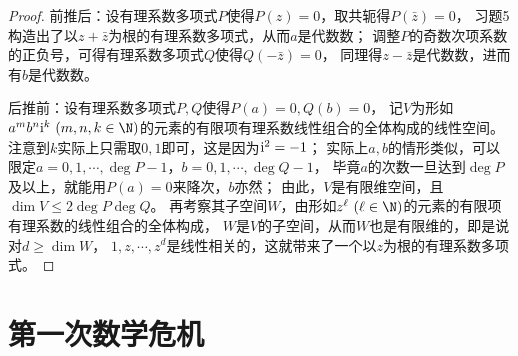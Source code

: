 \begin{1b}
\begin{enumerate}
\begin{proof}
前推后：设有理系数多项式$P$使得$P(z)=0$，取共轭得$P(\bar{z})=0$，
习题5构造出了以$z+\bar{z}$为根的有理系数多项式，从而$a$是代数数；
调整$P$的奇数次项系数的正负号，可得有理系数多项式$Q$使得$Q(-\bar{z})=0$，
同理得$z-\bar{z}$是代数数，进而有$b$是代数数。

后推前：设有理系数多项式$P,Q$使得$P(a)=0,Q(b)=0$，
记$V$为形如$a^mb^n{\rm i}^k\ (m,n,k\in\N)$的元素的有限项有理系数线性组合的全体构成的线性空间。
注意到$k$实际上只需取$0,1$即可，这是因为${\rm i}^2=-1$；
实际上$a,b$的情形类似，可以限定$a=0,1,\cdots,\deg P-1$，$b=0,1,\cdots,\deg Q-1$，
毕竟$a$的次数一旦达到$\deg P$及以上，就能用$P(a)=0$来降次，$b$亦然；
由此，$V$是有限维空间，且$\dim V\leqslant2\deg P\deg Q$。
再考察其子空间$W$，由形如$z^\ell\ (\ell\in\N)$的元素的有限项有理系数的线性组合的全体构成，
$W$是$V$的子空间，从而$W$也是有限维的，即是说对$d\geqslant\dim W$，
$1,z,\cdots,z^d$是线性相关的，这就带来了一个以$z$为根的有理系数多项式。
\end{proof}
\end{enumerate}
\end{1b}
\section{第一次数学危机}
